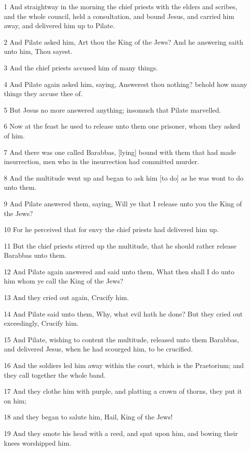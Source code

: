\par 1 And straightway in the morning the chief priests with the elders and scribes, and the whole council, held a consultation, and bound Jesus, and carried him away, and delivered him up to Pilate.
\par 2 And Pilate asked him, Art thou the King of the Jews? And he answering saith unto him, Thou sayest.
\par 3 And the chief priests accused him of many things.
\par 4 And Pilate again asked him, saying, Answerest thou nothing? behold how many things they accuse thee of.
\par 5 But Jesus no more answered anything; insomuch that Pilate marvelled.
\par 6 Now at the feast he used to release unto them one prisoner, whom they asked of him.
\par 7 And there was one called Barabbas, [lying] bound with them that had made insurrection, men who in the insurrection had committed murder.
\par 8 And the multitude went up and began to ask him [to do] as he was wont to do unto them.
\par 9 And Pilate answered them, saying, Will ye that I release unto you the King of the Jews?
\par 10 For he perceived that for envy the chief priests had delivered him up.
\par 11 But the chief priests stirred up the multitude, that he should rather release Barabbas unto them.
\par 12 And Pilate again answered and said unto them, What then shall I do unto him whom ye call the King of the Jews?
\par 13 And they cried out again, Crucify him.
\par 14 And Pilate said unto them, Why, what evil hath he done? But they cried out exceedingly, Crucify him.
\par 15 And Pilate, wishing to content the multitude, released unto them Barabbas, and delivered Jesus, when he had scourged him, to be crucified.
\par 16 And the soldiers led him away within the court, which is the Praetorium; and they call together the whole band.
\par 17 And they clothe him with purple, and platting a crown of thorns, they put it on him;
\par 18 and they began to salute him, Hail, King of the Jews!
\par 19 And they smote his head with a reed, and spat upon him, and bowing their knees worshipped him.
